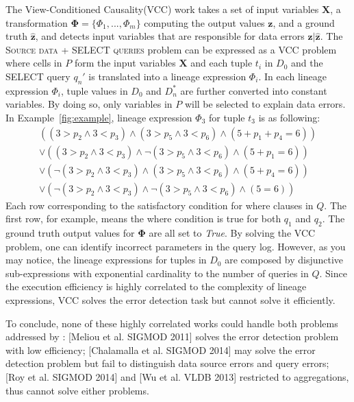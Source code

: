 The View-Conditioned Causality(VCC) work takes a set of input variables $\mathbf{X}$, a transformation $\mathbf{\Phi} =\{\Phi_1, ... , \Phi_m\}$ computing the
output values $\mathbf{z}$, and a ground truth $\hat{\mathbf{z}}$, and detects input variables that are responsible for data errors $\mathbf{z}|\hat{\mathbf{z}}$. 
The \textsc{Source data + SELECT queries} problem can be expressed as a VCC problem where cells in $P$ form the input variables $\mathbf{X}$ and each tuple $t_i$ in $D_0$ and the SELECT query $q_n'$ is translated into a lineage expression $\Phi_i$. In each lineage expression $\Phi_i$, tuple values in $D_0$ and $D_n^*$ are further converted into constant variables. By doing so, only variables in $P$ will be selected to explain data errors. In Example~\ref{fig:example}, lineage expression $\Phi_3$ for tuple $t_3$ is as following:
{\small
\begin{eqnarray*}
&((3 > p_2 \wedge 3 < p_3) \wedge (3 > p_5 \wedge 3 < p_6) \wedge (5 + p_1+p_4 = 6)) &\\
&\vee ((3 > p_2 \wedge 3 < p_3) \wedge \neg(3 > p_5 \wedge 3 < p_6) \wedge (5 + p_1= 6))& \\
&\vee (\neg(3 > p_2 \wedge 3 < p_3) \wedge (3 > p_5 \wedge 3 < p_6) \wedge (5 + p_4= 6))& \\
&\vee (\neg(3 > p_2 \wedge 3 < p_3) \wedge \neg(3 > p_5 \wedge 3 < p_6) \wedge (5 = 6))&
\end{eqnarray*}
}
Each row corresponding to the satisfactory condition for where clauses in $Q$. The first row, for example, means the where condition is true for both $q_1$ and $q_2$. The ground truth output values for $\mathbf{\Phi}$ are all set to \textit{True}. By solving the VCC problem, one can identify incorrect parameters in the query log. However, as you may notice, the lineage expressions for tuples in $D_0$ are composed by disjunctive sub-expressions with exponential cardinality to the number of queries in $Q$. Since the execution efficiency is highly correlated to the complexity of lineage expressions, VCC solves the error detection task but cannot solve it efficiently. 

To conclude, none of these highly correlated works could handle both problems addressed by \sys: [Meliou et al. SIGMOD 2011] solves the error detection problem with low efficiency; [Chalamalla et al. SIGMOD 2014] may solve the error detection problem but fail to distinguish data source errors and query errors; [Roy et al. SIGMOD 2014] and [Wu et al. VLDB 2013] restricted to aggregations, thus cannot solve either problems.


